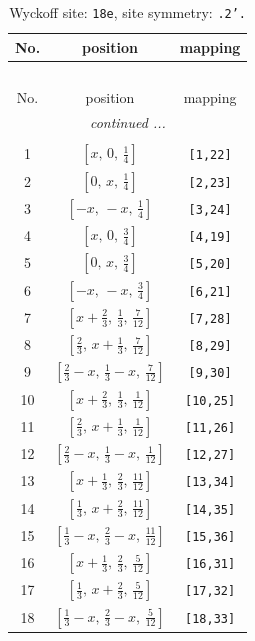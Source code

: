 \documentclass[fleqn,8pt]{jsarticle}
\begin{document}
\renewcommand{\arraystretch}{1.2}
\begin{longtable}{ccc}
\caption{Wyckoff site: {\tt 18e}, site symmetry: {\tt .2'.}}
 \\
 \hline \hline
No. & position & mapping \\ \hline \endfirsthead

\multicolumn{2}{l}{\tablename\ \thetable{}} \\
 \hline \hline
No. & position & mapping \\ \hline \endhead

 \hline \hline
\multicolumn{2}{r}{\footnotesize\it continued ...} \\ \endfoot

 \hline \hline
\multicolumn{2}{r}{} \\ \endlastfoot

1 & $\left[ x,\, 0,\, \frac{1}{4} \right]$ & {\tt [1,22]} \\ \hline
2 & $\left[ 0,\, x,\, \frac{1}{4} \right]$ & {\tt [2,23]} \\ \hline
3 & $\left[ - x,\, - x,\, \frac{1}{4} \right]$ & {\tt [3,24]} \\ \hline
4 & $\left[ x,\, 0,\, \frac{3}{4} \right]$ & {\tt [4,19]} \\ \hline
5 & $\left[ 0,\, x,\, \frac{3}{4} \right]$ & {\tt [5,20]} \\ \hline
6 & $\left[ - x,\, - x,\, \frac{3}{4} \right]$ & {\tt [6,21]} \\ \hline
7 & $\left[ x + \frac{2}{3},\, \frac{1}{3},\, \frac{7}{12} \right]$ & {\tt [7,28]} \\ \hline
8 & $\left[ \frac{2}{3},\, x + \frac{1}{3},\, \frac{7}{12} \right]$ & {\tt [8,29]} \\ \hline
9 & $\left[ \frac{2}{3} - x,\, \frac{1}{3} - x,\, \frac{7}{12} \right]$ & {\tt [9,30]} \\ \hline
10 & $\left[ x + \frac{2}{3},\, \frac{1}{3},\, \frac{1}{12} \right]$ & {\tt [10,25]} \\ \hline
11 & $\left[ \frac{2}{3},\, x + \frac{1}{3},\, \frac{1}{12} \right]$ & {\tt [11,26]} \\ \hline
12 & $\left[ \frac{2}{3} - x,\, \frac{1}{3} - x,\, \frac{1}{12} \right]$ & {\tt [12,27]} \\ \hline
13 & $\left[ x + \frac{1}{3},\, \frac{2}{3},\, \frac{11}{12} \right]$ & {\tt [13,34]} \\ \hline
14 & $\left[ \frac{1}{3},\, x + \frac{2}{3},\, \frac{11}{12} \right]$ & {\tt [14,35]} \\ \hline
15 & $\left[ \frac{1}{3} - x,\, \frac{2}{3} - x,\, \frac{11}{12} \right]$ & {\tt [15,36]} \\ \hline
16 & $\left[ x + \frac{1}{3},\, \frac{2}{3},\, \frac{5}{12} \right]$ & {\tt [16,31]} \\ \hline
17 & $\left[ \frac{1}{3},\, x + \frac{2}{3},\, \frac{5}{12} \right]$ & {\tt [17,32]} \\ \hline
18 & $\left[ \frac{1}{3} - x,\, \frac{2}{3} - x,\, \frac{5}{12} \right]$ & {\tt [18,33]} \\
\end{longtable}
\end{document}
